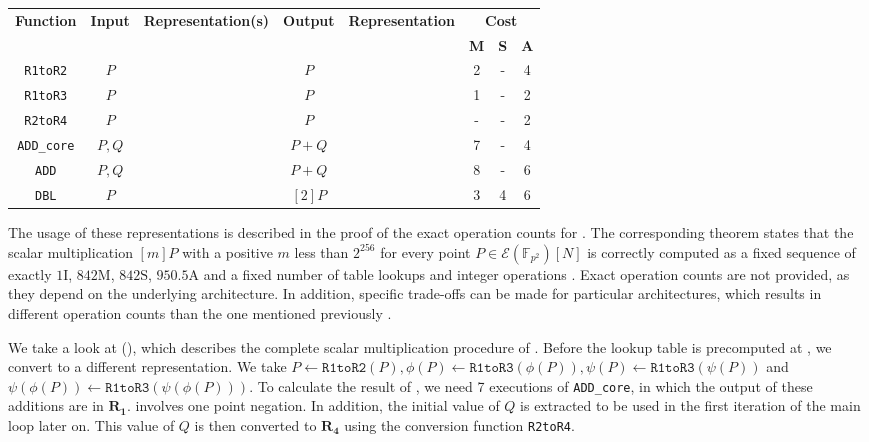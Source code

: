 %
\begin{table}
	\centering
	\begin{tabular}{cccccccc}
		\toprule
		\textbf{Function} & \textbf{Input} & \textbf{Representation(s)}& \textbf{Output} & \textbf{Representation} & \multicolumn{3}{c}{\textbf{Cost}} \\
		& & & & & \textbf{M} & \textbf{S} & \textbf{A} \\
		\bottomrule
		\texttt{R1toR2} & $P$ & \bm{$R_1$} & $P$ & \bm{$R_2$} & 2 & - & 4 \\
		\texttt{R1toR3} & $P$ & \bm{$R_1$} & $P$ & \bm{$R_3$} & 1 & - & 2 \\
		\texttt{R2toR4} & $P$ & \bm{$R_2$} & $P$ & \bm{$R_4$} & - & - & 2 \\
		\midrule
		\texttt{ADD\_core} & $P, Q$ & \bm{$R_3, R_2$} & $P+Q$ & \bm{$R_1$} & 7 & - & 4 \\
		\texttt{ADD} & $P, Q$ & \bm{$R_1, R_2$} & $P+Q$ & \bm{$R_1$} & 8 & - & 6 \\
		\texttt{DBL} & $P$ & \bm{$R_4$} & $[2]P$ & \bm{$R_1$} & 3 & 4 & 6 \\
		\bottomrule
	\end{tabular}
	\label{table: twisted Edwards coordinates summary}
\end{table}
%
The usage of these representations is described in the proof of the exact operation counts for {\fourq}.
The corresponding theorem states that the scalar multiplication $[m]P$ with a positive $m$ less than $2^{256}$ for every point $P \in \mathcal{E}(\mathbb{F}_{p^2}) \left[ N \right]$ is correctly computed as a fixed sequence of exactly $1\bm{\mathrm{I}}$, $842\bm{\mathrm{M}}$, $842\bm{\mathrm{S}}$, $950.5\bm{\mathrm{A}}$ and a fixed number of table lookups and integer operations \cite{costello2015fourq}. 
Exact operation counts are not provided, as they depend on the underlying architecture.
In addition, specific trade-offs can be made for particular architectures, which results in different operation counts than the one mentioned previously \cite{costello2015fourq}.

We take a look at  (), which describes the complete scalar multiplication procedure of {\fourq}.
Before the lookup table is precomputed at , we convert to a different representation. 
We take $P \gets \texttt{R1toR2}(P), \phi(P) \gets \texttt{R1toR3}(\phi(P)),\psi(P) \gets \texttt{R1toR3}(\psi(P))$ and $\psi(\phi(P)) \gets \texttt{R1toR3}(\psi(\phi(P)))$.
To calculate the result of , we need 7 executions of \texttt{ADD\_core}, in which the output of these additions are in $\bm{R_1}$.
 involves one point negation.
In addition, the initial value of $Q$ is extracted to be used in the first iteration of the main loop later on.
This value of $Q$ is then converted to $\bm{R_4}$ using the conversion function \texttt{R2toR4}.